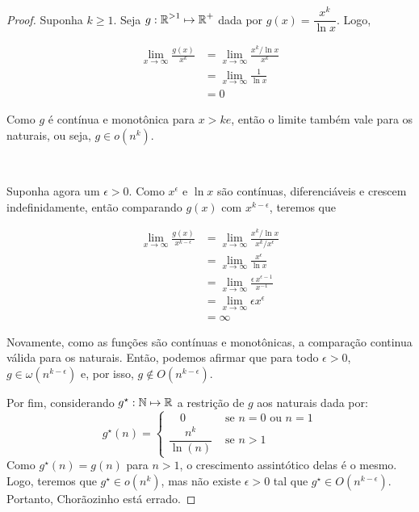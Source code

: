 \begin{proof}
    Suponha $k \geq 1$. Seja $g: \operatorname{\mathbb{R}}^{>1} \mapsto \operatorname{\mathbb{R}}^+$ dada por $g(x) = \dfrac{x^k}{\ln x}$. Logo,

    \begin{align*}
        \lim_{x \to \infty} \frac{g(x)}{x^k}
        &= \lim_{x \to \infty} \frac{x^k / \ln x}{x^k} \\
        &= \lim_{x \to \infty} \frac{1}{\ln x} \\
        &= 0
    \end{align*}

    Como $g$ é contínua e monotônica para $x > k e$, então o limite também vale para os naturais, ou seja, $g \in o\left(n^k\right)$.

    ~

    Suponha agora um $\epsilon > 0$. Como $x^\epsilon$ e $\ln x$ são contínuas, diferenciáveis e crescem indefinidamente, então  comparando $g(x)$ com $x^{k - \epsilon}$, teremos que

    \begin{align*}
        \lim_{x \to \infty} \frac{g(x)}{x^{k-\epsilon}}
        &= \lim_{x \to \infty} \frac{x^k / \ln x}{x^k / x^\epsilon} \\
        &= \lim_{x \to \infty} \frac{x^\epsilon}{\ln x} \\
        &= \lim_{x \to \infty} \frac{\epsilon\, x^{\epsilon-1}}{x^{-1}} \\
        &= \lim_{x \to \infty} \epsilon x^\epsilon \\
        &= \infty
    \end{align*}

    Novamente, como as funções são contínuas e monotônicas, a comparação continua válida para os naturais. Então, podemos afirmar que para todo $\epsilon > 0$, $g \in \omega\left(n^{k-\epsilon}\right)$ e, por isso, $g \not\in O\left(n^{k-\epsilon}\right)$.

    Por fim, considerando $g^\star: \operatorname{\mathbb{N}} \mapsto \operatorname{\mathbb{R}}$ a restrição de $g$ aos naturais dada por:
    \[
        g^\star(n) = \begin{cases}
            \quad 0 & \text{ se } n = 0 \text{ ou } n = 1 \\
            \dfrac{n^k}{\ln(n)} & \text{ se } n > 1
        \end{cases}
    \]
    Como $g^\star(n) = g(n)$ para $n > 1$, o crescimento assintótico delas é o mesmo. Logo, teremos que $g^\star \in o\left(n^k\right)$, mas não existe $\epsilon > 0$ tal que $g^\star \in O\left(n^{k-\epsilon}\right)$. Portanto, Chorãozinho está errado.
\end{proof}

